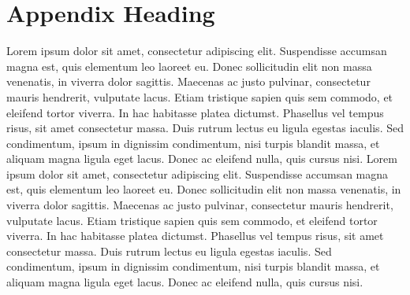 \documentclass{article}
\begin{document}
\section{Appendix Heading}
Lorem ipsum dolor sit amet, consectetur adipiscing elit. Suspendisse accumsan magna est, quis elementum leo laoreet eu. Donec sollicitudin elit non massa venenatis, in viverra dolor sagittis. Maecenas ac justo pulvinar, consectetur mauris hendrerit, vulputate lacus. Etiam tristique sapien quis sem commodo, et eleifend tortor viverra. In hac habitasse platea dictumst. Phasellus vel tempus risus, sit amet consectetur massa. Duis rutrum lectus eu ligula egestas iaculis. Sed condimentum, ipsum in dignissim condimentum, nisi turpis blandit massa, et aliquam magna ligula eget lacus. Donec ac eleifend nulla, quis cursus nisi. Lorem ipsum dolor sit amet, consectetur adipiscing elit. Suspendisse accumsan magna est, quis elementum leo laoreet eu. Donec sollicitudin elit non massa venenatis, in viverra dolor sagittis. Maecenas ac justo pulvinar, consectetur mauris hendrerit, vulputate lacus. Etiam tristique sapien quis sem commodo, et eleifend tortor viverra. In hac habitasse platea dictumst. Phasellus vel tempus risus, sit amet consectetur massa. Duis rutrum lectus eu ligula egestas iaculis. Sed condimentum, ipsum in dignissim condimentum, nisi turpis blandit massa, et aliquam magna ligula eget lacus. Donec ac eleifend nulla, quis cursus nisi.
\end{document}
